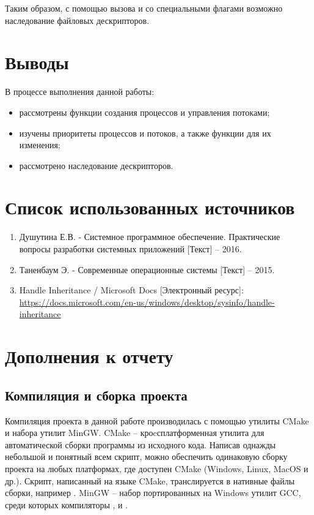 Таким образом, с помощью вызова  и  со специальными флагами возможно наследование файловых дескрипторов.

\section{Выводы}

В процессе выполнения данной работы:

\begin{itemize}
	\item рассмотрены функции создания процессов и управления потоками;
	\item изучены приоритеты процессов и потоков, а также функции для их изменения;
	\item рассмотрено наследование дескрипторов.
\end{itemize}

\section*{Список использованных источников}

\begin{enumerate}
	\item Душутина Е.В. - Системное программное обеспечение. Практические вопросы разработки системных приложений [Текст] -- 2016.
	\item Таненбаум Э. - Современные операционные системы [Текст] -- 2015.
	\item Handle Inheritance / Microsoft Docs [Электронный ресурс]:\\
		{\small\url{https://docs.microsoft.com/en-us/windows/desktop/sysinfo/handle-inheritance}} 
\end{enumerate}

\section*{Дополнения к отчету}

\subsection*{Компиляция и сборка проекта}

Компиляция проекта в данной работе производилась с помощью утилиты CMake и набора утилит MinGW. CMake -- кроcсплатформенная утилита для автоматической сборки программы из исходного кода.  Написав однажды небольшой и понятный всем скрипт, можно обеспечить одинаковую сборку проекта на любых платформах, где доступен CMake (Windows, Linux, MacOS и др.). Скрипт, написанный на языке CMake, транслируется в нативные файлы сборки, например . MinGW -- набор портированных на Windows утилит GCC, среди которых компиляторы ,  и . 

